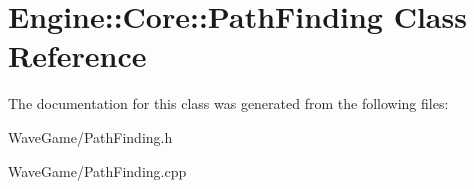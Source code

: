 \hypertarget{class_engine_1_1_core_1_1_path_finding}{}\section{Engine\+:\+:Core\+:\+:Path\+Finding Class Reference}
\label{class_engine_1_1_core_1_1_path_finding}


The documentation for this class was generated from the following files\+:\begin{DoxyCompactItemize}
\item 
Wave\+Game/Path\+Finding.\+h\item 
Wave\+Game/Path\+Finding.\+cpp\end{DoxyCompactItemize}
